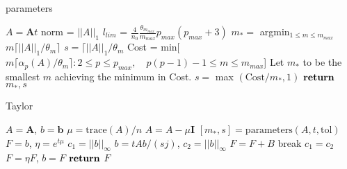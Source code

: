 \begin{algorithm}
	\caption{parameters} 
	\begin{algorithmic}[1]
		\State $A = \boldsymbol{A}t$
		\State norm = $||A||_{1}$
        \State $l_{lim}$ = $\frac{4}{n_{0}}\frac{\theta_{m_{max}}}{m_{max}}p_{max}(p_{max}+3)$
            \State $m_{*} = $ argmin$_{1 \leq m \leq m_{max}}$ $m\lceil ||A||_{1}/\theta_{m}\rceil$
            \State $s = \lceil ||A||_{1}/\theta_{m}$
        \Else
            \State Cost = min[$m\lceil \alpha_{p}(A)/\theta_{m}\rceil : 2 \leq p \leq p_{max},\quad p(p-1) -1 \leq m \leq m_{max}$]
            \State Let $m_{*}$ to be the smallest $m$ achieving the minimum in Cost.
            \State$s = $ max $(\text{Cost}/m_{*}, 1)$
        \EndIf
        \State ${\text{\textbf{return}}}$ $m_{*}, s$  
		\EndProcedure
	\end{algorithmic} 
	\label{alg:taylor_parameters}
\end{algorithm}

\begin{algorithm}
	\caption{Taylor} 
	\begin{algorithmic}[1]
		\State $A = \boldsymbol{A}$, $b = \boldsymbol{b}$
        \State $\mu = \text{trace}(A)/n$
        \State $A = A - \mu \boldsymbol{I}$
        \State $[m_{*}, s] = \text{parameters}(A, t, \text{tol})$
        \State $F = b$, $\eta = e^{t\mu}$
            \State $c_{1} = ||b||_{\infty}$
                \State $b = tAb/(sj)$, $c_{2} = ||b||_{\infty}$
                \State $ F = F + B$
                    \State break
                \EndIf
                \State $c_{1} = c_{2}$
            \EndFor
            \State $F = \eta F$, $b = F$
        \EndFor
        \State ${\text{\textbf{return}}}$ $F$  
		\EndProcedure
	\end{algorithmic} 
	\label{alg:taylor}
\end{algorithm}